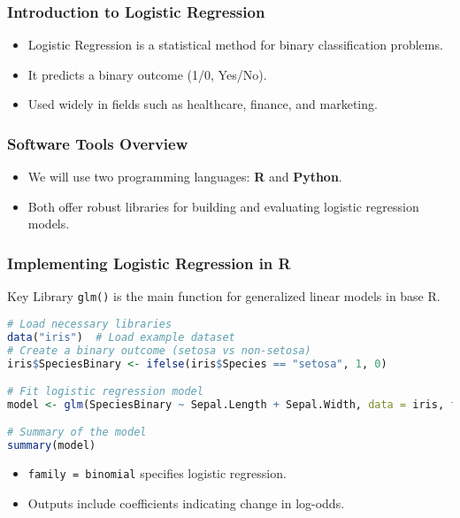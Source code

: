 \documentclass[aspectratio=169]{beamer}
\begin{document}
\begin{frame}
    \titlepage
\end{frame}

\begin{frame}
    \frametitle{Introduction to Logistic Regression}
    \begin{itemize}
        \item Logistic Regression is a statistical method for binary classification problems.
        \item It predicts a binary outcome (1/0, Yes/No).
        \item Used widely in fields such as healthcare, finance, and marketing.
    \end{itemize}
\end{frame}

\begin{frame}
    \frametitle{Software Tools Overview}
    \begin{itemize}
        \item We will use two programming languages: \textbf{R} and \textbf{Python}.
        \item Both offer robust libraries for building and evaluating logistic regression models.
    \end{itemize}
\end{frame}

\begin{frame}[fragile]
    \frametitle{Implementing Logistic Regression in R}
    \begin{block}{Key Library}
        \texttt{glm()} is the main function for generalized linear models in base R.
    \end{block}
    
    \begin{lstlisting}[language=R]
# Load necessary libraries
data("iris")  # Load example dataset
# Create a binary outcome (setosa vs non-setosa)
iris$SpeciesBinary <- ifelse(iris$Species == "setosa", 1, 0)

# Fit logistic regression model
model <- glm(SpeciesBinary ~ Sepal.Length + Sepal.Width, data = iris, family = binomial)

# Summary of the model
summary(model)
    \end{lstlisting}
    
    \begin{itemize}
        \item \texttt{family = binomial} specifies logistic regression.
        \item Outputs include coefficients indicating change in log-odds.
    \end{itemize}
\end{frame}
\end{document}
